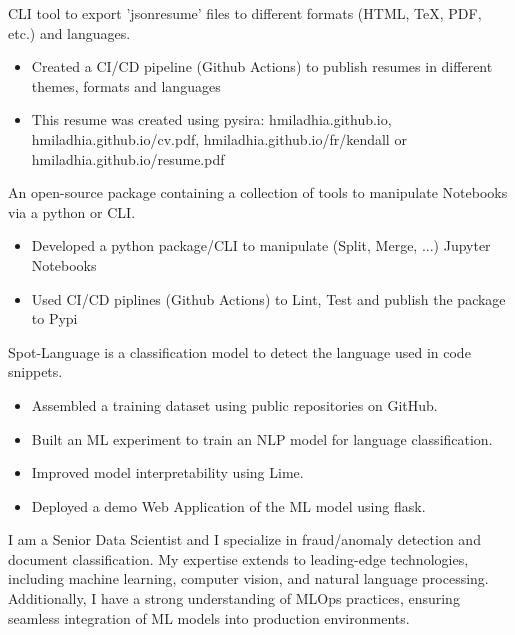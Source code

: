 \documentclass[10pt,letter,ragged2e,withhyper]{altacv}
\renewcommand{\divider}{\textcolor{body!30}{\hdashrule{\linewidth}{0.6pt}{0.5ex}}\medskip}
\begin{document}
\begin{paracol}{2}
CLI tool to export 'jsonresume' files to different formats (HTML, TeX, PDF, etc.) and languages.

\begin{itemize}
      \item Created a CI/CD pipeline (Github Actions) to publish resumes in different themes, formats and languages
      \item This resume was created using pysira: hmiladhia.github.io, hmiladhia.github.io/cv.pdf, hmiladhia.github.io/fr/kendall or hmiladhia.github.io/resume.pdf
  \end{itemize}

\divider
{}

An open-source package containing a collection of tools to manipulate Notebooks via a python or CLI.

\begin{itemize}
      \item Developed a python package/CLI to manipulate (Split, Merge, ...) Jupyter Notebooks
      \item Used CI/CD piplines (Github Actions) to Lint, Test and publish the package to Pypi
  \end{itemize}

\divider
{}

Spot-Language is a classification model to detect the language used in code snippets.

\begin{itemize}
      \item Assembled a training dataset using public repositories on GitHub.
      \item Built an ML experiment to train an NLP model for language classification.
      \item Improved model interpretability using Lime.
      \item Deployed a demo Web Application of the ML model using flask.
  \end{itemize}



\switchcolumn
{}
{\small
I am a Senior Data Scientist and I specialize in fraud/anomaly detection and document classification.
My expertise extends to leading-edge technologies, including machine learning, computer vision, and natural language processing.
Additionally, I have a strong understanding of MLOps practices, 
ensuring seamless integration of ML models into production environments.

}
\end{paracol}
\end{document}
